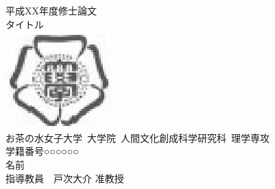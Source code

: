 \begin{center}
{\Large 平成XX年度修士論文}\\
\vspace{6cm}
{\Huge タイトル}\\
\vspace{2cm}
\centering\includegraphics[totalheight=1.7cm]{ocha_logo}\\
\vspace{2cm}
{\Large お茶の水女子大学\ 大学院\ 人間文化創成科学研究科\ 理学専攻\\
\vspace{2mm}
学籍番号○○○○○○\\ 
\vspace{2mm}
名前}\\
\vspace{2cm}
{\Large 指導教員\ \ 戸次大介 准教授}
\end{center}
